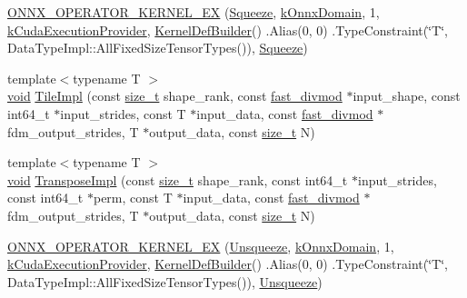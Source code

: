 \begin{DoxyCompactItemize}
\item 
\mbox{\hyperlink{namespaceonnxruntime_1_1cuda_a7819346fd6c2bffc4e5d3fee9d0bbc41}{O\+N\+N\+X\+\_\+\+O\+P\+E\+R\+A\+T\+O\+R\+\_\+\+K\+E\+R\+N\+E\+L\+\_\+\+EX}} (\mbox{\hyperlink{classonnxruntime_1_1cuda_1_1Squeeze}{Squeeze}}, \mbox{\hyperlink{namespaceonnxruntime_ac0e7c0c106a2c9e9594560a3ab289fa0}{k\+Onnx\+Domain}}, 1, \mbox{\hyperlink{namespaceonnxruntime_a73ebc64887ddd1968e3cef47ffefe35b}{k\+Cuda\+Execution\+Provider}}, \mbox{\hyperlink{classonnxruntime_1_1KernelDefBuilder}{Kernel\+Def\+Builder}}() .Alias(0, 0) .Type\+Constraint(\char`\"{}T\char`\"{}, Data\+Type\+Impl\+::\+All\+Fixed\+Size\+Tensor\+Types()), \mbox{\hyperlink{classonnxruntime_1_1cuda_1_1Squeeze}{Squeeze}})
\item 
{\footnotesize template$<$typename T $>$ }\\\mbox{\hyperlink{mlasi_8h_a88f941d423cb2a819b70a1358982b1a6}{void}} \mbox{\hyperlink{namespaceonnxruntime_1_1cuda_a87fd1918977bb7b705e1c56d6524e5b2}{Tile\+Impl}} (const \mbox{\hyperlink{mlasi_8h_a503efbc1c6e50825320ad909366b78ab}{size\+\_\+t}} shape\+\_\+rank, const \mbox{\hyperlink{classonnxruntime_1_1cuda_1_1fast__divmod}{fast\+\_\+divmod}} $\ast$input\+\_\+shape, const int64\+\_\+t $\ast$input\+\_\+strides, const T $\ast$input\+\_\+data, const \mbox{\hyperlink{classonnxruntime_1_1cuda_1_1fast__divmod}{fast\+\_\+divmod}} $\ast$fdm\+\_\+output\+\_\+strides, T $\ast$output\+\_\+data, const \mbox{\hyperlink{mlasi_8h_a503efbc1c6e50825320ad909366b78ab}{size\+\_\+t}} N)
\item 
{\footnotesize template$<$typename T $>$ }\\\mbox{\hyperlink{mlasi_8h_a88f941d423cb2a819b70a1358982b1a6}{void}} \mbox{\hyperlink{namespaceonnxruntime_1_1cuda_af64c8129bc67a4b75fe313352c808808}{Transpose\+Impl}} (const \mbox{\hyperlink{mlasi_8h_a503efbc1c6e50825320ad909366b78ab}{size\+\_\+t}} shape\+\_\+rank, const int64\+\_\+t $\ast$input\+\_\+strides, const int64\+\_\+t $\ast$perm, const T $\ast$input\+\_\+data, const \mbox{\hyperlink{classonnxruntime_1_1cuda_1_1fast__divmod}{fast\+\_\+divmod}} $\ast$fdm\+\_\+output\+\_\+strides, T $\ast$output\+\_\+data, const \mbox{\hyperlink{mlasi_8h_a503efbc1c6e50825320ad909366b78ab}{size\+\_\+t}} N)
\item 
\mbox{\hyperlink{namespaceonnxruntime_1_1cuda_a266cfd6135f468ba999b210879e45159}{O\+N\+N\+X\+\_\+\+O\+P\+E\+R\+A\+T\+O\+R\+\_\+\+K\+E\+R\+N\+E\+L\+\_\+\+EX}} (\mbox{\hyperlink{classonnxruntime_1_1cuda_1_1Unsqueeze}{Unsqueeze}}, \mbox{\hyperlink{namespaceonnxruntime_ac0e7c0c106a2c9e9594560a3ab289fa0}{k\+Onnx\+Domain}}, 1, \mbox{\hyperlink{namespaceonnxruntime_a73ebc64887ddd1968e3cef47ffefe35b}{k\+Cuda\+Execution\+Provider}}, \mbox{\hyperlink{classonnxruntime_1_1KernelDefBuilder}{Kernel\+Def\+Builder}}() .Alias(0, 0) .Type\+Constraint(\char`\"{}T\char`\"{}, Data\+Type\+Impl\+::\+All\+Fixed\+Size\+Tensor\+Types()), \mbox{\hyperlink{classonnxruntime_1_1cuda_1_1Unsqueeze}{Unsqueeze}})

\end{DoxyCompactItemize}
